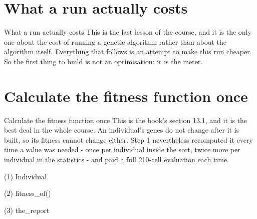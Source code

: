 \section{What a run actually costs}

\begin{frame}{What a run actually costs}
This is the last lesson of the course, and it is the only one about the cost of
running a genetic algorithm rather than about the algorithm itself. Everything
that follows is an attempt to make this run cheaper. So the first thing to build
is not an optimisation: it is the meter.
\end{frame}


\section{Calculate the fitness function once}

\begin{frame}{Calculate the fitness function once}
This is the book's section 13.1, and it is the best deal in the whole course.
An individual's genes do not change after it is built, so its fitness cannot
change either. Step 1 nevertheless recomputed it every time a value was needed
- once per individual inside the sort, twice more per individual in the
statistics - and paid a full 210-cell evaluation each time.
\end{frame}

\begin{frame}[fragile]{(1) Individual}

\end{frame}

\begin{frame}[fragile]{(2) fitness\_of()}

\end{frame}

\begin{frame}[fragile]{(3) the\_report}

\end{frame}

